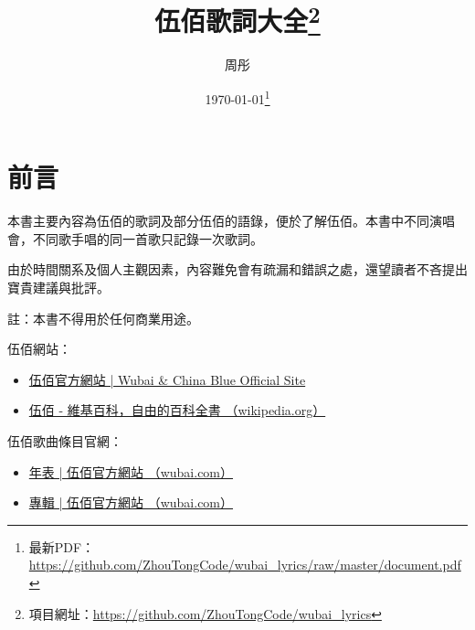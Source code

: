 \documentclass[UTF8,a4paper,oneside,twocolumn,12pt]{ctexbook}
\title{伍佰歌詞大全\thanks{項目網址：\url{https://github.com/ZhouTongCode/wubai_lyrics}}}
\author{周彤}
\date{\today\thanks{最新PDF：\url{https://github.com/ZhouTongCode/wubai_lyrics/raw/master/document.pdf}}}%
\begin{document}
\frontmatter
\maketitle

\onecolumn

\chapter*{前言}
本書主要內容為伍佰的歌詞及部分伍佰的語錄，便於了解伍佰。本書中不同演唱會，不同歌手唱的同一首歌只記錄一次歌詞。

由於時間關系及個人主觀因素，內容難免會有疏漏和錯誤之處，還望讀者不吝提出寶貴建議與批評。

註：本書不得用於任何商業用途。

伍佰網站：
\begin{itemize}
	\item \href{http://wubai.com/}{伍佰官方網站 | Wubai \& China Blue Official Site}
	\item \href{https://zh.wikipedia.org/zh-tw/%E4%BC%8D%E4%BD%B0}{伍佰 - 維基百科，自由的百科全書 （wikipedia.org）}
\end{itemize}

伍佰歌曲條目官網：
\begin{itemize}
	\item \href{http://wubai.com/biography/%e5%b9%b4%e8%a1%a8/}{年表 | 伍佰官方網站 （wubai.com）}
	\item \href{http://wubai.com/discography/%E5%B0%88%E8%BC%AF/}{專輯 | 伍佰官方網站 （wubai.com）}
\end{itemize}
\end{document}
